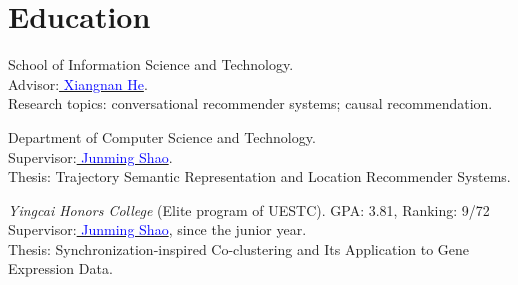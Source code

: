 \documentclass[11pt,a4paper,sans]{moderncv} %
\newcommand{\blue}[1]{{\textcolor{blue}{{} #1}}}
\begin{document}
\section{Education}


{School of Information Science and Technology. \vspace{1mm}\\
Advisor:\href{http://staff.ustc.edu.cn/~hexn/}{\blue{Xiangnan He}}.\vspace{1mm}\\
Research topics: conversational recommender systems; causal recommendation.}
\vspace{1mm}

{Department of Computer Science and Technology. \vspace{1mm}\\
Supervisor:\href{http://dm.uestc.edu.cn}{\blue{Junming Shao}}.\vspace{1mm}\\
Thesis: Trajectory Semantic Representation and Location Recommender Systems.}
\vspace{1mm}


{\textit{Yingcai Honors College} (Elite program of UESTC). GPA: 3.81, Ranking: 9/72\\
Supervisor:\href{http://dm.uestc.edu.cn}{\blue{Junming Shao}}, since the junior year.\vspace{1mm}\\
Thesis: Synchronization-inspired Co-clustering and Its Application to Gene Expression Data.}  %
\vspace{1mm}
\end{document}
